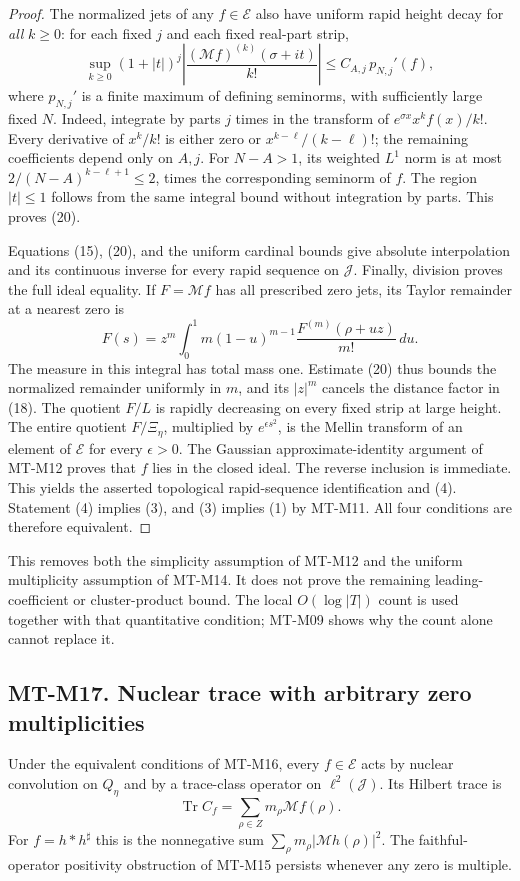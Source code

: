 \documentclass[11pt,a4paper]{article}
\begin{document}
\begin{proof}
The normalized jets of any $f\in\mathcal E$ also have
uniform rapid height decay for \emph{all} $k\ge0$:
for each fixed $j$ and each fixed real-part strip,
\[
 \sup_{k\ge0}
 (1+|t|)^j\left|\frac{(\mathcal Mf)^{(k)}(\sigma+it)}{k!}\right|
                    \le C_{A,j}\,p_{N,j}'(f),          \tag{20}
\]
where $p_{N,j}'$ is a finite maximum of defining
seminorms, with sufficiently large fixed $N$.
Indeed, integrate by parts $j$ times in the transform
of $e^{\sigma x}x^k f(x)/k!$.
Every derivative of $x^k/k!$ is either zero or
$x^{k-\ell}/(k-\ell)!$; the remaining coefficients
depend only on $A,j$. For $N-A>1$, its weighted
$L^1$ norm is at most
$2/(N-A)^{k-\ell+1}\le2$, times the corresponding
seminorm of $f$. The region $|t|\le1$ follows from
the same integral bound without integration by parts.
This proves (20).

Equations (15), (20), and the uniform cardinal bounds
give absolute interpolation and its continuous inverse
for every rapid sequence on $\mathcal J$.
Finally, division proves the full ideal equality.
If $F=\mathcal Mf$ has all prescribed zero jets, its
Taylor remainder at a nearest zero is
\[
 F(s)=z^m\int_0^1m(1-u)^{m-1}
                  \frac{F^{(m)}(\rho+uz)}{m!}\,du .
 \]
The measure in this integral has total mass one.
Estimate (20) thus bounds the normalized remainder
uniformly in $m$, and its $|z|^m$ cancels the distance
factor in (18). The quotient $F/L$ is rapidly
decreasing on every fixed strip at large height.
The entire quotient $F/\Xi_\eta$, multiplied by
$e^{\epsilon s^2}$, is the Mellin transform of an
element of $\mathcal E$ for every $\epsilon>0$.
The Gaussian approximate-identity argument of
MT-M12 proves that $f$ lies in the closed ideal.
The reverse inclusion is immediate.
This yields the asserted topological rapid-sequence
identification and (4). Statement (4) implies (3),
and (3) implies (1) by MT-M11. All four conditions
are therefore equivalent.
\end{proof}

This removes both the simplicity assumption of MT-M12 and the
uniform multiplicity assumption of MT-M14. It does not prove the
remaining leading-coefficient or cluster-product bound.
The local $O(\log|T|)$ count is used together with that
quantitative condition; MT-M09 shows why the count alone
cannot replace it.

\subsection*{MT-M17. Nuclear trace with arbitrary zero multiplicities}
Under the equivalent conditions of MT-M16, every
$f\in\mathcal E$ acts by nuclear convolution on $Q_\eta$
and by a trace-class operator on $\ell^2(\mathcal J)$.
Its Hilbert trace is
\[
       \operatorname{Tr}C_f
                  =\sum_{\rho\in Z}m_\rho\mathcal Mf(\rho).
\]
For $f=h*h^\sharp$ this is the nonnegative sum
$\sum_\rho m_\rho|\mathcal Mh(\rho)|^2$.
The faithful-operator positivity obstruction of MT-M15
persists whenever any zero is multiple.
\end{document}
